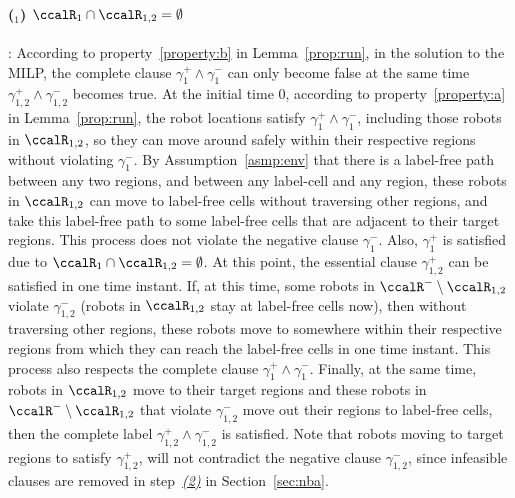 \documentclass[Afour,sageh,times]{sagej}
\newcounter{mycounter}
\begin{document}
{{\paragraph{ ($_1$) $\ccalR_1 \cap \ccalR_{1,2} = \emptyset$}\label{app:gmrpp_a}: According to property~\ref{property:b} in Lemma~\ref{prop:run}, in the solution to the MILP, the complete clause $\gamma_1^+ \wedge \gamma_1^-$ can only become false at the same time $\gamma_{1,2}^+ \wedge \gamma_{1,2}^-$ becomes true. At the initial time 0, according  to property~\ref{property:a} in Lemma~\ref{prop:run}, the robot locations satisfy $\gamma_1^+ \wedge \gamma_1^-$, including those robots in $\ccalR_{1,2}$, so  they can move around safely  within their respective regions without violating $\gamma_1^-$. By Assumption~\ref{asmp:env} that there is a label-free path between any two regions, and between any label-cell and any region, these robots in $\ccalR_{1,2}$ can move to label-free cells without traversing other regions, and take this label-free path to  some label-free cells that are adjacent to their target regions. This process does not  violate  the negative clause $\gamma_1^-$. Also, $\gamma_1^+$ is satisfied due to $\ccalR_1 \cap \ccalR_{1,2} = \emptyset$. At this point, the essential clause $\gamma_{1,2}^+$ can be satisfied in one  time instant. If, at this time, some robots in $\ccalR^-\setminus \ccalR_{1,2}$ violate $\gamma_{1,2}^-$ (robots in $\ccalR_{1,2}$ stay at label-free cells now), then without traversing other regions, these robots  move to somewhere within their respective regions from which they can reach the label-free cells in one time instant. This process also respects the complete clause $\gamma_1^+ \wedge \gamma_1^-$. Finally, at the same time, robots in $\ccalR_{1,2}$ move to their target regions and these robots in $\ccalR^-\setminus \ccalR_{1,2}$ that violate $\gamma_{1,2}^-$   move out their regions to label-free cells, then the complete label $\gamma_{1,2}^+ \wedge \gamma_{1,2}^-$ is satisfied. Note that robots moving to target regions to satisfy $\gamma_{1,2}^+$, will not contradict the negative clause $\gamma_{1,2}^-$, since infeasible clauses are removed in step~\hyperref[prune:exclusion2]{\it (2)} in Section~\ref{sec:nba}.


}}
\end{document}
